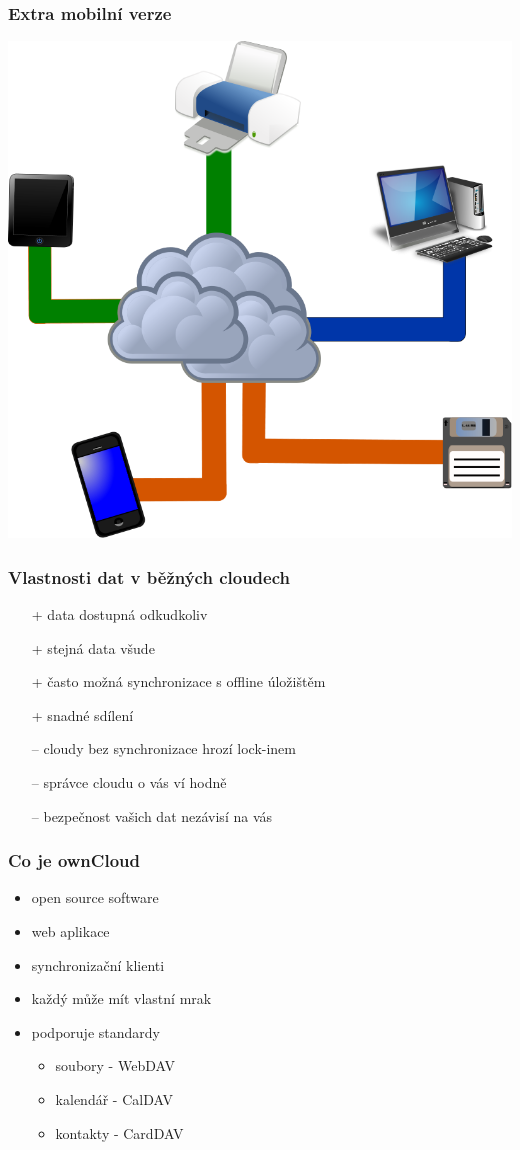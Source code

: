 \documentclass{beamer}
\begin{document}
\begin{frame}
\frametitle{Extra mobilní verze}
\begin{center}
\includegraphics[height=.7\paperheight]{Cloud_computing}
\end{center}
\end{frame}


\begin{frame}[t]
\frametitle{Vlastnosti dat v běžných cloudech}
\begin{itemize}
\item[+] data dostupná odkudkoliv
\item[+] stejná data všude
\item[+] často možná synchronizace s offline úložištěm
\item[+] snadné sdílení
\item[--] cloudy bez synchronizace hrozí lock-inem
\item[--] správce cloudu o vás ví hodně
\item[--] bezpečnost vašich dat nezávisí na vás
\end{itemize}
\end{frame}

\begin{frame}[t]
\frametitle{Co je ownCloud}
\begin{itemize}
\item open source software
\item web aplikace
\item synchronizační klienti
\item každý může mít vlastní mrak
\item podporuje standardy
\begin{itemize}
\item soubory - WebDAV
\item kalendář - CalDAV
\item kontakty - CardDAV
\end{itemize}
\end{itemize}
\end{frame}
\end{document}
